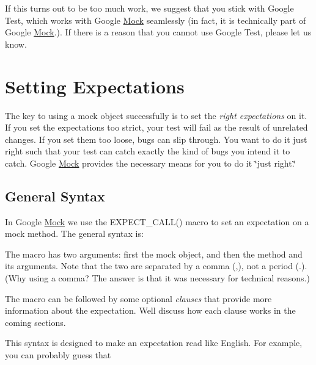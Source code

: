 If this turns out to be too much work, we suggest that you stick with Google Test, which works with Google \mbox{\hyperlink{class_mock}{Mock}} seamlessly (in fact, it is technically part of Google \mbox{\hyperlink{class_mock}{Mock}}.). If there is a reason that you cannot use Google Test, please let us know.

\section*{Setting Expectations}

The key to using a mock object successfully is to set the {\itshape right expectations} on it. If you set the expectations too strict, your test will fail as the result of unrelated changes. If you set them too loose, bugs can slip through. You want to do it just right such that your test can catch exactly the kind of bugs you intend it to catch. Google \mbox{\hyperlink{class_mock}{Mock}} provides the necessary means for you to do it \char`\"{}just right.\char`\"{}

\subsection*{General Syntax}

In Google \mbox{\hyperlink{class_mock}{Mock}} we use the {\ttfamily E\+X\+P\+E\+C\+T\+\_\+\+C\+A\+L\+L()} macro to set an expectation on a mock method. The general syntax is\+:


\begin{DoxyCode}{0}
\end{DoxyCode}


The macro has two arguments\+: first the mock object, and then the method and its arguments. Note that the two are separated by a comma ({\ttfamily ,}), not a period ({\ttfamily .}). (Why using a comma? The answer is that it was necessary for technical reasons.)

The macro can be followed by some optional {\itshape clauses} that provide more information about the expectation. We\textquotesingle{}ll discuss how each clause works in the coming sections.

This syntax is designed to make an expectation read like English. For example, you can probably guess that


\begin{DoxyCode}{0}
\end{DoxyCode}


